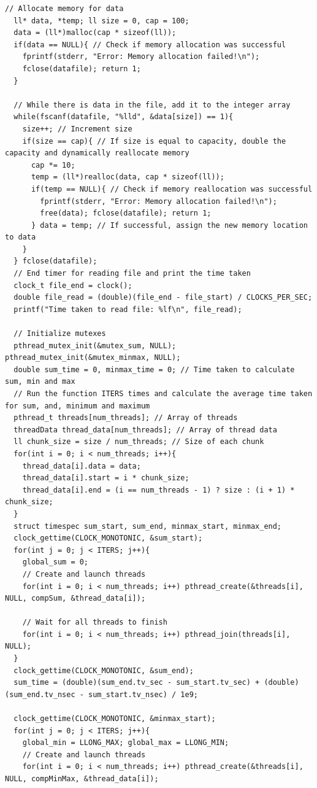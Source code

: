 \documentclass{article}
\theoremstyle{mytheoremstyle}
\theoremstyle{mytheoremstyle}
\theoremstyle{myproblemstyle}
\begin{document}
\begin{lstlisting}[caption={Multi-Threaded Program} label={lst:multi}]
  // Allocate memory for data
  ll* data, *temp; ll size = 0, cap = 100;
  data = (ll*)malloc(cap * sizeof(ll));
  if(data == NULL){ // Check if memory allocation was successful
    fprintf(stderr, "Error: Memory allocation failed!\n");
    fclose(datafile); return 1;
  }
  
  // While there is data in the file, add it to the integer array
  while(fscanf(datafile, "%lld", &data[size]) == 1){
    size++; // Increment size
    if(size == cap){ // If size is equal to capacity, double the capacity and dynamically reallocate memory
      cap *= 10;
      temp = (ll*)realloc(data, cap * sizeof(ll));
      if(temp == NULL){ // Check if memory reallocation was successful
        fprintf(stderr, "Error: Memory allocation failed!\n");
        free(data); fclose(datafile); return 1;
      } data = temp; // If successful, assign the new memory location to data
    }
  } fclose(datafile);
  // End timer for reading file and print the time taken
  clock_t file_end = clock();
  double file_read = (double)(file_end - file_start) / CLOCKS_PER_SEC;
  printf("Time taken to read file: %lf\n", file_read);

  // Initialize mutexes
  pthread_mutex_init(&mutex_sum, NULL); pthread_mutex_init(&mutex_minmax, NULL);
  double sum_time = 0, minmax_time = 0; // Time taken to calculate sum, min and max
  // Run the function ITERS times and calculate the average time taken for sum, and, minimum and maximum
  pthread_t threads[num_threads]; // Array of threads
  threadData thread_data[num_threads]; // Array of thread data
  ll chunk_size = size / num_threads; // Size of each chunk
  for(int i = 0; i < num_threads; i++){
    thread_data[i].data = data;
    thread_data[i].start = i * chunk_size;
    thread_data[i].end = (i == num_threads - 1) ? size : (i + 1) * chunk_size;
  }
  struct timespec sum_start, sum_end, minmax_start, minmax_end;
  clock_gettime(CLOCK_MONOTONIC, &sum_start);
  for(int j = 0; j < ITERS; j++){
    global_sum = 0; 
    // Create and launch threads
    for(int i = 0; i < num_threads; i++) pthread_create(&threads[i], NULL, compSum, &thread_data[i]);

    // Wait for all threads to finish
    for(int i = 0; i < num_threads; i++) pthread_join(threads[i], NULL);
  }
  clock_gettime(CLOCK_MONOTONIC, &sum_end);
  sum_time = (double)(sum_end.tv_sec - sum_start.tv_sec) + (double)(sum_end.tv_nsec - sum_start.tv_nsec) / 1e9;

  clock_gettime(CLOCK_MONOTONIC, &minmax_start);
  for(int j = 0; j < ITERS; j++){
    global_min = LLONG_MAX; global_max = LLONG_MIN;
    // Create and launch threads
    for(int i = 0; i < num_threads; i++) pthread_create(&threads[i], NULL, compMinMax, &thread_data[i]);
    

\end{lstlisting}
\end{document}
